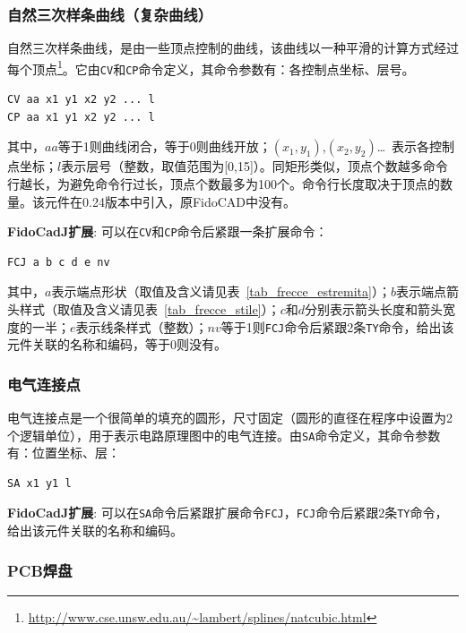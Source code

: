 \documentclass[10pt,a4paper,twoside]{scrreprt}
\begin{document}
\subsubsection{自然三次样条曲线（复杂曲线）}
自然三次样条曲线，是由一些顶点控制的曲线，该曲线以一种平滑的计算方式经过每个顶点\footnote{ \href{http://www.cse.unsw.edu.au/~lambert/splines/natcubic.html}{http://www.cse.unsw.edu.au/\textasciitilde lambert/splines/natcubic.html}}。它由\lstinline!CV!和\lstinline!CP!命令定义，其命令参数有：各控制点坐标、层号。
\begin{lstlisting}
CV aa x1 y1 x2 y2 ... l
CP aa x1 y1 x2 y2 ... l
\end{lstlisting}
其中，$aa$等于1则曲线闭合，等于0则曲线开放；$(x_1, y_1)$,$(x_2, y_2)$\dots\ 表示各控制点坐标；$l$表示层号（整数，取值范围为[0,15]）。同矩形类似，顶点个数越多命令行越长，为避免命令行过长，顶点个数最多为100个。命令行长度取决于顶点的数量。该元件在0.24版本中引入，原FidoCAD中没有。

\textbf{FidoCadJ扩展}: 可以在\lstinline!CV!和\lstinline!CP!命令后紧跟一条扩展命令：
\begin{lstlisting} 
FCJ a b c d e nv
\end{lstlisting}
其中，$a$表示端点形状（取值及含义请见表~\ref{tab_frecce_estremita}）；$b$表示端点箭头样式（取值及含义请见表~\ref{tab_frecce_stile}）；$c$和$d$分别表示箭头长度和箭头宽度的一半；$e$表示线条样式（整数）；$nv$等于1则\lstinline!FCJ!命令后紧跟2条\lstinline!TY!命令，给出该元件关联的名称和编码，等于0则没有。

\subsubsection{电气连接点}
电气连接点是一个很简单的填充的圆形，尺寸固定（圆形的直径在程序中设置为2个逻辑单位），用于表示电路原理图中的电气连接。由\lstinline!SA!命令定义，其命令参数有：位置坐标、层：
\begin{lstlisting}
SA x1 y1 l 
\end{lstlisting} 

\textbf{FidoCadJ扩展}: 可以在\lstinline!SA!命令后紧跟扩展命令\lstinline!FCJ!，\lstinline!FCJ!命令后紧跟2条\lstinline!TY!命令，给出该元件关联的名称和编码。

\subsubsection{PCB焊盘}
\end{document}
